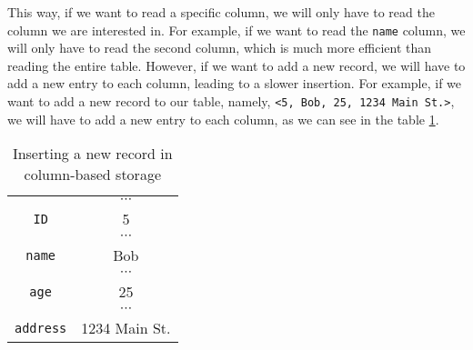 This way, if we want to read a specific column, we will only have to read the column we are interested in. For example, if we want to read the \texttt{name} column, we will only have to read the second column, which is much more efficient than reading the entire table. However, if we want to add a new record, we will have to add a new entry to each column, leading to a slower insertion. For example, if we want to add a new record to our table, namely, \texttt{<5, Bob, 25, 1234 Main St.>}, we will have to add a new entry to each column, as we can see in the table \ref{tab:column_based}.

\begin{table}[ht]
    \centering
    \begin{tabular}{|c|c|}
        \hline
        \cellcolor[HTML]{C0C0C0}                                   & $\cdots$      \\ \cline{2-2}
        \multirow{-2}{*}{\cellcolor[HTML]{C0C0C0}\texttt{ID}}      & 5             \\ \hline
        \cellcolor[HTML]{C0C0C0}                                   & $\cdots$      \\ \cline{2-2}
        \multirow{-2}{*}{\cellcolor[HTML]{C0C0C0}\texttt{name}}    & Bob           \\ \hline
        \cellcolor[HTML]{C0C0C0}                                   & $\cdots$      \\ \cline{2-2}
        \multirow{-2}{*}{\cellcolor[HTML]{C0C0C0}\texttt{age}}     & 25            \\ \hline
        \cellcolor[HTML]{C0C0C0}                                   & $\cdots$      \\ \cline{2-2}
        \multirow{-2}{*}{\cellcolor[HTML]{C0C0C0}\texttt{address}} & 1234 Main St. \\ \hline
    \end{tabular}
    \caption{Inserting a new record in column-based storage}
    \label{tab:column_based}
\end{table}

